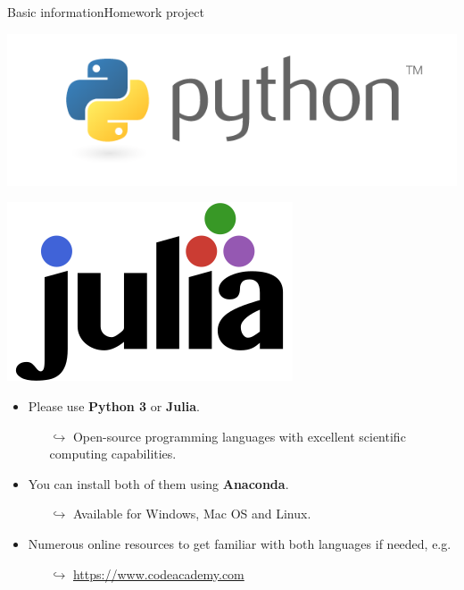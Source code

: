 \documentclass[usenames,dvipsnames,svgnames,10pt,aspectratio=169]{beamer}
\begin{document}
\begin{frame}[t, c]{Basic information}{Homework project}
	\begin{minipage}{.28\textwidth}
		\centering
		\includegraphics[height=.15\textheight]{python_logo}

		\bigskip

		\includegraphics[height=.15\textheight]{julia_logo}
	\end{minipage}%
	\hfill
	\begin{minipage}{.68\textwidth}
		\begin{itemize}
			\item Please use \alert{\textbf{Python 3}} or \alert{\textbf{Julia}}.
			\begin{itemize}
				\item[\( \hookrightarrow \)] Open-source programming languages with excellent scientific computing capabilities.
			\end{itemize}

			\medskip

			\item You can install both of them using \alert{\textbf{Anaconda}}.
			\begin{itemize}
				\item[\( \hookrightarrow \)] Available for Windows, Mac OS and Linux.
			\end{itemize}

			\medskip

			\item Numerous online resources to get familiar with both languages if needed, e.g.
			\begin{itemize}
				\item[\( \hookrightarrow \)] \url{https://www.codeacademy.com}
			\end{itemize}
		\end{itemize}
	\end{minipage}

	\vspace{1cm}
\end{frame}
\end{document}
